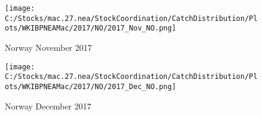 \documentclass{article}
\begin{document}
\begin{figure}
	\centering
		\texttt{[image: C:/Stocks/mac.27.nea/StockCoordination/CatchDistribution/Plots/WKIBPNEAMac/2017/NO/2017\_Nov\_NO.png]}
	\caption{Norway November 2017}
	\label{fig:2017_Nov_NO}
\end{figure}

\begin{figure}
	\centering
		\texttt{[image: C:/Stocks/mac.27.nea/StockCoordination/CatchDistribution/Plots/WKIBPNEAMac/2017/NO/2017\_Dec\_NO.png]}
	\caption{Norway December 2017}
	\label{fig:2017_Dec_NO}
\end{figure}
\end{document}
